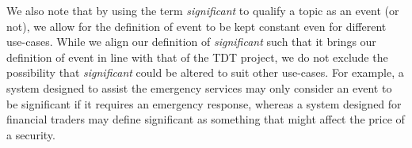 We also note that by using the term \emph{significant} to qualify a topic as an event (or not), we allow for the definition of event to be kept constant even for different use-cases.
While we align our definition of \emph{significant} such that it brings our definition of event in line with that of the TDT project, we do not exclude the possibility that \emph{significant} could be altered to suit other use-cases.
For example, a system designed to assist the emergency services may only consider an event to be significant if it requires an emergency response, whereas a system designed for financial traders may define significant as something that might affect the price of a security.
